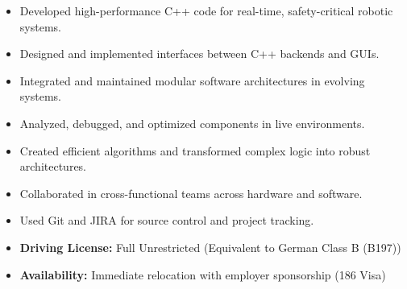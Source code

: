 \documentclass[10pt,a4paper,ragged2e,withhyper]{altacv}
\begin{document}
\begin{paracol}{2}
	\begin{itemize}
		\item Developed high-performance C++ code for real-time, safety-critical robotic systems.
		\item Designed and implemented interfaces between C++ backends and GUIs.
		\item Integrated and maintained modular software architectures in evolving systems.
		\item Analyzed, debugged, and optimized components in live environments.
		\item Created efficient algorithms and transformed complex logic into robust architectures.
		\item Collaborated in cross-functional teams across hardware and software.
		\item Used Git and JIRA for source control and project tracking.
	\end{itemize}


	\begin{itemize}
	  \item \textbf{Driving License:} Full Unrestricted (Equivalent to German Class B (B197))
	  \item \textbf{Availability:} Immediate relocation with employer sponsorship (186 Visa)
	\end{itemize}




	\switchcolumn



\end{paracol}
\end{document}
